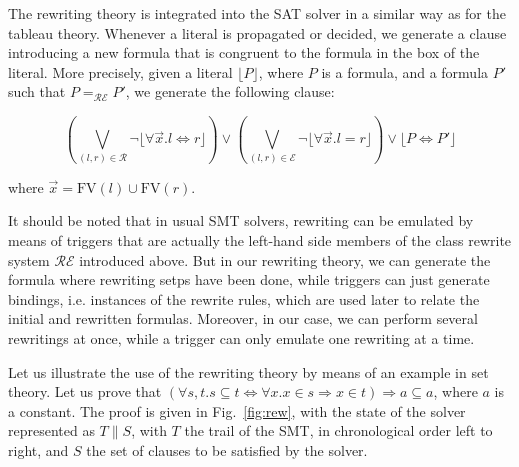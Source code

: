 The rewriting theory is integrated into the SAT solver in a similar way as for
the tableau theory. Whenever a literal is propagated or decided, we generate a
clause introducing a new formula that is congruent to the formula in the box of
the literal. More precisely, given a literal $\lfloor{}P\rfloor$, where $P$ is a
formula, and a formula $P'$ such that $P=_\mathcal{RE}P'$, we generate the
following clause:

$$\left(\bigvee_{(l,r)\in\mathcal{R}}
\neg\lfloor\forall{}\vec{x}.l\Leftrightarrow{}r\rfloor\right)\lor
\left(\bigvee_{(l,r)\in\mathcal{E}}\neg\lfloor\forall{}\vec{x}.l=r\rfloor\right)\lor
\lfloor{}P\Leftrightarrow{}P'\rfloor$$

where $\vec{x}=\mathrm{FV}(l)\cup\mathrm{FV}(r)$.

It should be noted that in usual SMT solvers, rewriting can be emulated by means
of triggers that are actually the left-hand side members of the class rewrite
system $\mathcal{RE}$ introduced above. But in our rewriting theory, we can
generate the formula where rewriting setps have been done, while triggers can just
generate bindings, i.e. instances of the rewrite rules, which are used later to
relate the initial and rewritten formulas. Moreover, in our case, we can perform
several rewritings at once, while a trigger can only emulate one rewriting at a
time.

Let us illustrate the use of the rewriting theory by means of an example in set
theory. Let us prove that
$(\forall{}s,t.s\subseteq{}t\Leftrightarrow{}\forall{}x.x\in{}s\Rightarrow{}
x\in{}t) \Rightarrow{} {}a\subseteq{}a$, where $a$ is a constant. The proof is given
in Fig.~\ref{fig:rew}, with the state of the solver represented as $T \parallel S$,
with $T$ the trail of the SMT, in chronological order left to right, and $S$ the set
of clauses to be satisfied by the solver.

